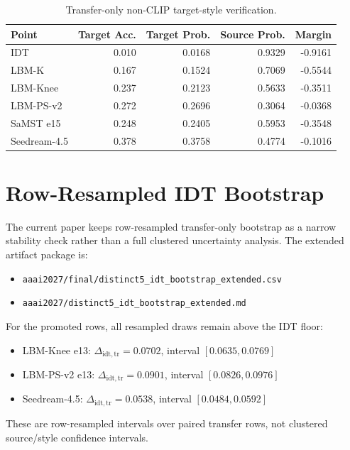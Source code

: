 \documentclass[letterpaper]{article}
\begin{document}
\begin{table}[t]
\centering
\caption{Transfer-only non-CLIP target-style verification.}
\small
\begin{tabular}{@{}lrrrr@{}}
\toprule
Point & Target Acc. & Target Prob. & Source Prob. & Margin \\
\midrule
IDT & 0.010 & 0.0168 & 0.9329 & -0.9161 \\
LBM-K & 0.167 & 0.1524 & 0.7069 & -0.5544 \\
LBM-Knee & 0.237 & 0.2123 & 0.5633 & -0.3511 \\
LBM-PS-v2 & 0.272 & 0.2696 & 0.3064 & -0.0368 \\
SaMST e15 & 0.248 & 0.2405 & 0.5953 & -0.3548 \\
Seedream-4.5 & 0.378 & 0.3758 & 0.4774 & -0.1016 \\
\bottomrule
\end{tabular}
\end{table}

\section{Row-Resampled IDT Bootstrap}
The current paper keeps row-resampled transfer-only bootstrap as a narrow stability check rather than a full clustered uncertainty analysis. The extended artifact package is:
\begin{itemize}
\item \texttt{aaai2027/final/distinct5\_idt\_bootstrap\_extended.csv}
\item \texttt{aaai2027/distinct5\_idt\_bootstrap\_extended.md}
\end{itemize}

For the promoted rows, all resampled draws remain above the IDT floor:
\begin{itemize}
\item LBM-Knee e13: $\Delta_{\mathrm{idt,tr}}=0.0702$, interval $[0.0635, 0.0769]$
\item LBM-PS-v2 e13: $\Delta_{\mathrm{idt,tr}}=0.0901$, interval $[0.0826, 0.0976]$
\item Seedream-4.5: $\Delta_{\mathrm{idt,tr}}=0.0538$, interval $[0.0484, 0.0592]$
\end{itemize}
These are row-resampled intervals over paired transfer rows, not clustered source/style confidence intervals.
\end{document}
